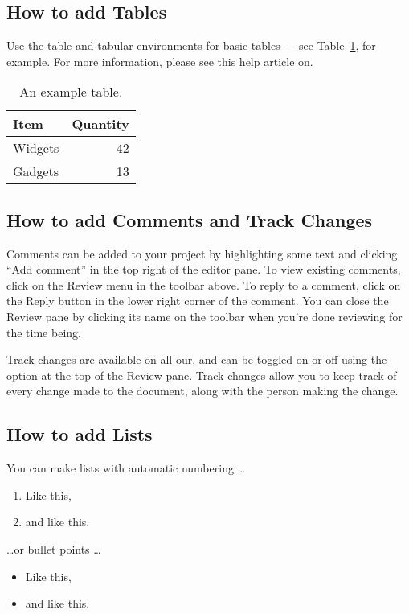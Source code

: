 \subsection{How to add Tables}

Use the table and tabular environments for basic tables --- see Table~\ref{tab:widgets},
for example. For more information, please see this help article on.

\begin{table}
	\centering
	\begin{tabular}{l|r}
		Item    & Quantity \\
		\hline
		Widgets & 42       \\
		Gadgets & 13
	\end{tabular}
	\caption{\label{tab:widgets}An example table.}
\end{table}

\subsection{How to add Comments and Track Changes}

Comments can be added to your project by highlighting some text and clicking ``Add
comment'' in the top right of the editor pane. To view existing comments, click
on the Review menu in the toolbar above. To reply to a comment, click on the
Reply button in the lower right corner of the comment. You can close the Review pane
by clicking its name on the toolbar when you're done reviewing for the time being.

Track changes are available on all our, and can be toggled on or off using the
option at the top of the Review pane. Track changes allow you to keep track of every
change made to the document, along with the person making the change.

\subsection{How to add Lists}

You can make lists with automatic numbering \dots

\begin{enumerate}
	\item Like this,

	\item and like this.
\end{enumerate}
\dots or bullet points \dots
\begin{itemize}
	\item Like this,

	\item and like this.
\end{itemize}

